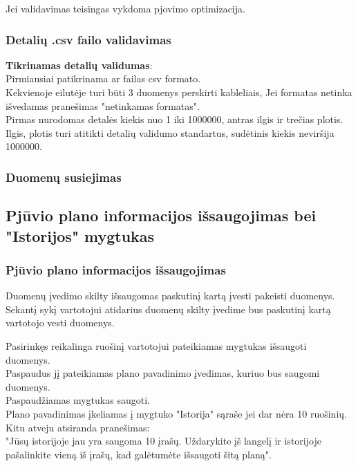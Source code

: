 \documentclass[a4paper,12pt]{article}
\begin{document}
Jei validavimas teisingas vykdoma pjovimo optimizacija.

\subsubsection{Detalių .csv failo validavimas}
\textbf{Tikrinamas detalių validumas}:\\
	Pirmiausiai patikrinama ar failas csv formato. \\
	Kekvienoje eilutėje turi būti 3 duomenys perskirti kableliais, Jei formatas netinka 
	išvedamas pranešimas "netinkamas formatas". \\
	Pirmas nurodomas detalės kiekis nuo 1 iki 1000000, antras ilgis ir trečias plotis. \\
	Ilgis, plotis turi atitikti detalių validumo standartus, sudėtinis kiekis neviršija 1000000.\\
	


\subsubsection{Duomenų susiejimas}





\subsection{ Pjūvio plano informacijos išsaugojimas bei "Istorijos" mygtukas}
\subsubsection{Pjūvio plano informacijos išsaugojimas}
Duomenų įvedimo skilty išsaugomas paskutinį kartą įvesti pakeisti duomenys.\\
Sekantį sykį vartotojui atidarius duomenų skilty įvedime bus paskutinį kartą vartotojo vesti duomenys.

Pasirinkęs reikalinga ruošinį vartotojui pateikiamas mygtukas išsaugoti duomenys. \\
Paspaudus jį pateikiamas plano pavadinimo įvedimas, kuriuo bus saugomi duomenys. \\
Paspaudžiamas mygtukas saugoti. \\
Plano pavadinimas įkeliamas į mygtuko "Istorija" sąraše jei dar nėra 10 ruošinių.\\
Kitu atveju atsiranda pranešimas: \\
"Jūsų istorijoje jau yra saugoma 10 įrašų. Uždarykite įš langelį ir istorijoje pašalinkite vieną iš įrašų, kad galėtumėte išsaugoti šitą planą". \\
\end{document}
